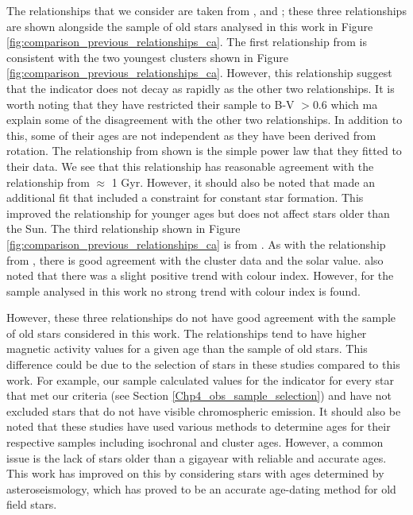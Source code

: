 The relationships that we consider are taken from \citet{Soderblom_etal_1991}, \citet{Lachaume_etal_1999} and \citet{Mamajek_Hillenbrand_2008}; these three relationships are shown alongside the sample of old stars analysed in this work in Figure \ref{fig:comparison_previous_relationships_ca}. The first relationship from \citet{Lachaume_etal_1999} is consistent with the two youngest clusters shown in Figure \ref{fig:comparison_previous_relationships_ca}. However, this relationship suggest that the \Rprime indicator does not decay as rapidly as the other two relationships. It is worth noting that they have restricted their sample to B-V $> 0.6$ which ma explain some of the disagreement with the other two relationships. In addition to this, some of their ages are not independent as they have been derived from rotation. The relationship from \citet{Soderblom_etal_1991} shown is the simple power law that they fitted to their data. We see that this relationship has reasonable agreement with the \citet{Mamajek_Hillenbrand_2008} relationship from $\approx$ 1 Gyr. However, it should also be noted that \citet{Soderblom_etal_1991} made an additional fit that included a constraint for constant star formation. This improved the relationship for younger ages but does not affect stars older than the Sun. The third relationship shown in Figure \ref{fig:comparison_previous_relationships_ca} is from \citet{Mamajek_Hillenbrand_2008}. As with the relationship from \citet{Soderblom_etal_1991}, there is good agreement with the cluster data and the solar value. \citet{Mamajek_Hillenbrand_2008} also noted that there was a slight positive trend with colour index. However, for the sample analysed in this work no strong trend with colour index is found.

However, these three relationships do not have good agreement with the sample of old stars considered in this work. The relationships tend to have higher magnetic activity values for a given age than the sample of old stars. This difference could be due to the selection of stars in these studies compared to this work. For example, our sample calculated values for the \Rprime indicator for every star that met our criteria (see Section \ref{Chp4_obs_sample_selection}) and have not excluded stars that do not have visible chromospheric emission. It should also be noted that these studies have used various methods to determine ages for their respective samples including isochronal and cluster ages. However, a common issue is the lack of stars older than a gigayear with reliable and accurate ages. This work has improved on this by considering stars with ages determined by asteroseismology, which has proved to be an accurate age-dating method for old field stars.

